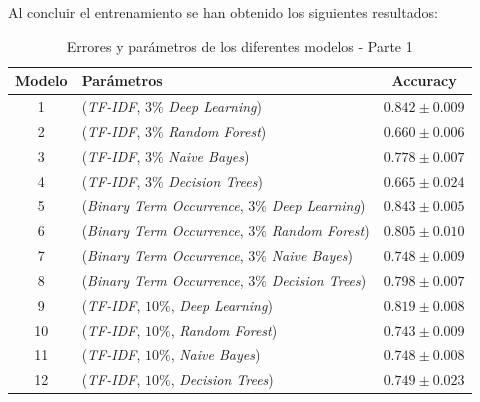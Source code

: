 \documentclass[es]{uc3mreport}
\begin{document}
\begin{report}
    Al concluir el entrenamiento se han obtenido los siguientes resultados:

    \begin{table}[H]
        \begin{center}
            \begin{tabular}{ @{}clc@{} }
                \toprule
                Modelo & Parámetros\footnotemark[1] & Accuracy\\
                \midrule
                1  & (\textit{TF-IDF}, $3\%$                 \textit{Deep Learning})  & $0.842 \pm 0.009$ \\
                2  & (\textit{TF-IDF}, $3\%$                 \textit{Random Forest})  & $0.660 \pm 0.006$ \\
                3  & (\textit{TF-IDF}, $3\%$                 \textit{Naive Bayes})    & $0.778 \pm 0.007$ \\
                4  & (\textit{TF-IDF}, $3\%$                 \textit{Decision Trees}) & $0.665 \pm 0.024$ \\
                5  & (\textit{Binary Term Occurrence}, $3\%$ \textit{Deep Learning})  & $0.843 \pm 0.005$ \\
                6  & (\textit{Binary Term Occurrence}, $3\%$ \textit{Random Forest})  & $0.805 \pm 0.010$ \\
                7  & (\textit{Binary Term Occurrence}, $3\%$ \textit{Naive Bayes})    & $0.748 \pm 0.009$ \\
                8  & (\textit{Binary Term Occurrence}, $3\%$ \textit{Decision Trees}) & $0.798 \pm 0.007$ \\
                9  & (\textit{TF-IDF}, $10\%$,               \textit{Deep Learning})  & $0.819 \pm 0.008$ \\
                10 & (\textit{TF-IDF}, $10\%$,               \textit{Random Forest})  & $0.743 \pm 0.009$ \\
                11 & (\textit{TF-IDF}, $10\%$,               \textit{Naive Bayes})    & $0.748 \pm 0.008$ \\
                12 & (\textit{TF-IDF}, $10\%$,               \textit{Decision Trees}) & $0.749 \pm 0.023$ \\
                \bottomrule
            \end{tabular}
            \caption{Errores y parámetros de los diferentes modelos - Parte 1}
        \end{center}
    \end{table}


\end{report}
\end{document}

